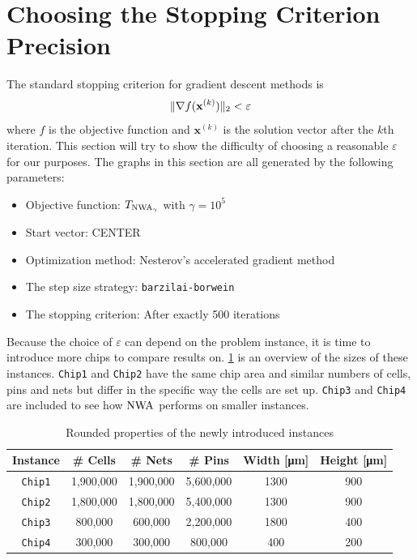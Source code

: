 \section{Choosing the Stopping Criterion Precision} \label{sec:choosing_stopping_criterion_precision}

The standard stopping criterion for gradient descent methods is 
\[\lVert\nabla f(\mathbf{x}^{(k)})\rVert_2 < \varepsilon\]
where \(f\) is the objective function and \(\mathbf{x}^{(k)}\) is the solution vector after the \(k\)th iteration.
This section will try to show the difficulty of choosing a reasonable \(\varepsilon\) for our purposes.
The graphs in this section are all generated by the following parameters:
\begin{itemize}
 \item Objective function: \(T_{\operatorname{NWA}_\gamma}\) with \(\gamma = 10^5\)
 \item Start vector: CENTER
 \item Optimization method: Nesterov's accelerated gradient method
 \item The step size strategy: \texttt{barzilai-borwein}
 \item The stopping criterion: After exactly 500 iterations
\end{itemize}

Because the choice of \(\varepsilon\) can depend on the problem instance,
it is time to introduce more chips to compare results on.
\cref{table:chip_properties} is an overview of the sizes of these instances.
\texttt{Chip1} and \texttt{Chip2} have the same chip area and similar numbers of cells, pins and nets
but differ in the specific way the cells are set up.
\texttt{Chip3} and \texttt{Chip4} are included to see how \(\operatorname{NWA}\) performs on smaller instances.

\begin{table}[ht] 
 \centering
 \begin{tabular}{c c c c c c}
  Instance       & \# Cells & \# Nets   & \# Pins   & Width [\si{\micro\meter}] & Height [\si{\micro\meter}] \\
  \hline
  \texttt{Chip1} & 1,900,000        & 1,900,000 & 5,600,000 & 1300                          & 900 \\
  \texttt{Chip2} & 1,800,000        & 1,800,000 & 5,400,000 & 1300                          & 900 \\
  \texttt{Chip3} & 800,000          & 600,000   & 2,200,000 & 1800                          & 400 \\
  \texttt{Chip4} & 300,000          & 300,000   & 800,000   & 400                           & 200 \\
 \end{tabular}
 \caption{Rounded properties of the newly introduced instances}
 \label{table:chip_properties}
\end{table}


